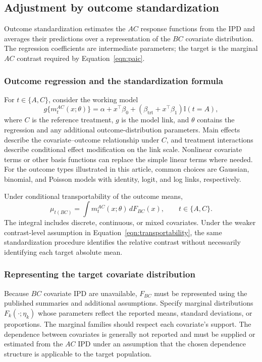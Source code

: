 \documentclass[article]{jss}
\begin{document}
\subsection{Adjustment by outcome standardization}
\label{sec:outcome-standardization}
Outcome standardization estimates the $AC$ response functions from the IPD and averages their predictions over a representation of the $BC$ covariate distribution. The regression coefficients are intermediate parameters; the target is the marginal $AC$ contrast required by Equation~\ref{eqn:paic}.

\subsubsection{Outcome regression and the standardization formula}
For $t\in\{A,C\}$, consider the working model
\begin{equation}
\label{eqn:outcome-regression}
g\{m_t^{AC}(x;\theta)\}
=\alpha+x^\top\beta_0+
  (\beta_{\mathrm{trt}}+x^\top\beta_1)\mathbb{I}(t=A),
\end{equation}
where $C$ is the reference treatment, $g$ is the model link, and $\theta$ contains the regression and any additional outcome-distribution parameters. Main effects describe the covariate--outcome relationship under $C$, and treatment interactions describe conditional effect modification on the link scale. Nonlinear covariate terms or other basis functions can replace the simple linear terms where needed. For the outcome types illustrated in this article, common choices are Gaussian, binomial, and Poisson models with identity, logit, and log links, respectively.

Under conditional transportability of the outcome means,
\begin{equation}
\label{eqn:marginal-outcome}
\mu_{t(BC)}=\int m_t^{AC}(x;\theta)\,dF_{BC}(x),
\qquad t\in\{A,C\}.
\end{equation}
The integral includes discrete, continuous, or mixed covariates. Under the weaker contrast-level assumption in Equation~\ref{eqn:transportability}, the same standardization procedure identifies the relative contrast without necessarily identifying each target absolute mean.

\subsubsection{Representing the target covariate distribution}
\label{sec:synth-cohort}
Because $BC$ covariate IPD are unavailable, $F_{BC}$ must be represented using the published summaries and additional assumptions. Specify marginal distributions $F_k(\cdot;\eta_k)$ whose parameters reflect the reported means, standard deviations, or proportions. The marginal families should respect each covariate's support. The dependence between covariates is generally not reported and must be supplied or estimated from the $AC$ IPD under an assumption that the chosen dependence structure is applicable to the target population.
\end{document}
